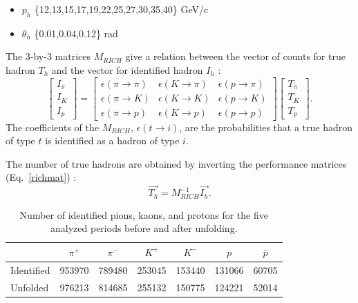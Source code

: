 \begin{itemize}
  \item $p_h$ \{12,13,15,17,19,22,25,27,30,35,40\} GeV/c
  \item $\theta_h$ \{0.01,0.04,0.12\} rad
\end{itemize}

The $3$-by-$3$ matrices $M_{RICH}$ give a relation between the vector of counts for true hadron $T_h$ and the vector for identified hadron $I_h$ :
%
\begin{equation}
\begin{bmatrix}
I_{\pi} \\
I_K \\
I_p
\end{bmatrix}
=
\begin{bmatrix}
\epsilon(\pi \rightarrow \pi) & \epsilon(K \rightarrow \pi) & \epsilon(p \rightarrow \pi)\\
\epsilon(\pi \rightarrow K) & \epsilon(K \rightarrow K) & \epsilon(p \rightarrow K) \\
\epsilon(\pi \rightarrow p) & \epsilon(K \rightarrow p) & \epsilon(p \rightarrow p)
\end{bmatrix}
\begin{bmatrix}
T_{\pi} \\
T_K \\
T_p
\end{bmatrix}.
\end{equation}
%
The coefficients of the $M_{RICH}$, $\epsilon(t \rightarrow i)$, are the probabilities that a true hadron of type
$t$ is identified as a hadron of type $i$.

The number of true hadrons are obtained by inverting the performance matrices (Eq.~\ref{richmat}) :
%
\begin{equation}
  \overrightarrow{T_h} = M^{-1}_{RICH}\overrightarrow{I_h}.
	\label{richmat}
\end{equation}
%
\begin{table}[!h]
  \caption{\label{HadNum} Number of identified pions, kaons, and protons for the five analyzed periods before and after unfolding.}
  \centering
  \begin{tabular}{lcccccc}
    \hline
     & $\pi^+$ & $\pi^-$ & $K^+$ & $K^-$ & $p$ & $\bar{p}$ \\
    \hline
    Identified & 953970 & 789480 & 253045 & 153440 & 131066 & 60705 \\
    Unfolded & 976213 & 814685 & 255132 & 150775 & 124221 & 52014 \\
    \hline
  \end{tabular}
\end{table}

